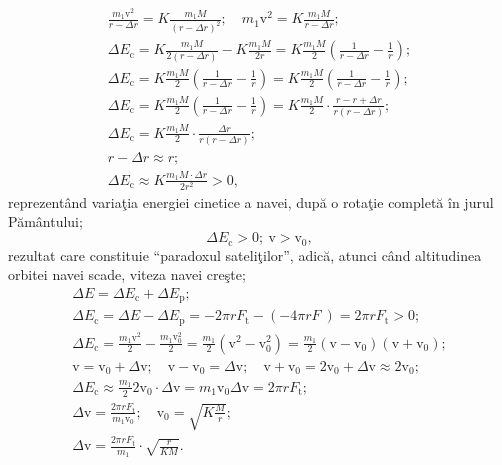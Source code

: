 \begin{description}
\begin{gather*}
    \frac{m_1\mathrm{v}^2}{r - \Delta r}
      = K\frac{m_1M}{(r - \Delta r)^2};\quad
      m_1\mathrm{v}^2 = K\frac{m_1M}{r - \Delta r}; \\
    \Delta E_{\mathrm{c}} = K\frac{m_1M}{2(r - \Delta r)}
      - K\frac{m_1M}{2r}
      = K\frac{m_1M}{2}\left(\frac{1}{r - \Delta r} - \frac{1}{r}\right); \\
    \Delta E_{\mathrm{c}} = K\frac{m_1M}{2}
      \left(\frac{1}{r - \Delta r} - \frac{1}{r}\right)
      = K\frac{m_1M}{2}
      \left(\frac{1}{r - \Delta r} - \frac{1}{r}\right); \\ %
    \Delta E_{\mathrm{c}} = K\frac{m_1M}{2}
      \left(\frac{1}{r - \Delta r} - \frac{1}{r}\right)
      = K\frac{m_1M}{2}\cdot\frac{r - r + \Delta r}{r(r - \Delta r)}; \\
    \Delta E_{\mathrm{c}} = K\frac{m_1M}{2}\cdot
      \frac{\Delta r}{r(r - \Delta r)}; \\
    r - \Delta r \approx r; \\
    \Delta E_{\mathrm{c}} \approx K\frac{m_1M\cdot\Delta r}{2r^2} > 0,
  \end{gather*}
  reprezent\^and varia\c{t}ia energiei cinetice a navei, dup\u{a} o rota\c{t}ie
  complet\u{a} \^in jurul P\u{a}m\^antului; %
  \[
    \Delta E_{\mathrm{c}} > 0;\ \mathrm{v} > \mathrm{v}_0,
  \]
  rezultat care constituie ``paradoxul sateli\c{t}ilor'', adic\u{a}, atunci
  c\^and altitudinea orbitei navei scade, viteza navei cre\c{s}te;
  \begin{gather*}
    \Delta E = \Delta E_{\mathrm{c}} + \Delta E_{\mathrm{p}}; \\
    \Delta E_{\mathrm{c}} = \Delta E - \Delta E_{\mathrm{p}}
      = -2\pi rF_{\mathrm{t}} - \left(-4\pi rF\ \right)
      = 2\pi rF_{\mathrm{t}} > 0; \\ %
    \Delta E_{\mathrm{c}} = \frac{m_1\mathrm{v}^2}{2}
      - \frac{m_1\mathrm{v}_0^2}{2}
      = \frac{m_1}{2}\left(\mathrm{v}^2 - \mathrm{v}_0^2\right)
      = \frac{m_1}{2}\left(\mathrm{v} - \mathrm{v}_0\right)
        \left(\mathrm{v} + \mathrm{v}_0\right); \\
    \mathrm{v} = \mathrm{v}_0 + \Delta\mathrm{v};\quad
      \mathrm{v} - \mathrm{v}_0 = \Delta\mathrm{v};\quad
      \mathrm{v} + \mathrm{v}_0 = 2\mathrm{v}_0 + \Delta\mathrm{v}
      \approx 2\mathrm{v}_0; \\
    \Delta E_{\mathrm{c}} \approx \frac{m_1}{2}2\mathrm{v}_0\cdot
      \Delta\mathrm{v} = m_1\mathrm{v}_0\Delta\mathrm{v}
      = 2\pi rF_{\mathrm{t}}; \\
    \Delta\mathrm{v} = \frac{2\pi rF_{\mathrm{t}}}{m_1\mathrm{v}_0};\quad
      \mathrm{v}_0 = \sqrt{K\frac{M}{r}}; \\
    \Delta\mathrm{v} = \frac{2\pi rF_{\mathrm{t}}}{m_1}\cdot
      \sqrt{\frac{r}{KM}}.
  \end{gather*}


\end{description}
